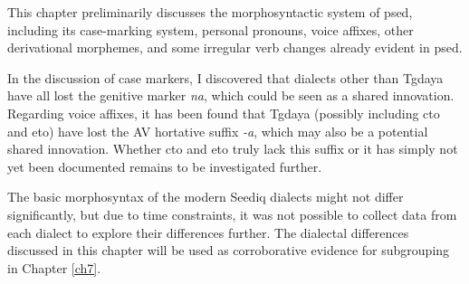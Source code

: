 
This chapter preliminarily discusses the morphosyntactic system of \acl{psed}, including its case-marking system, personal pronouns, voice affixes, other derivational morphemes, and some irregular verb changes already evident in \acl{psed}.

In the discussion of case markers, I discovered that dialects other than Tgdaya have all lost the genitive marker \textit{na}, which could be seen as a shared innovation. Regarding voice affixes, it has been found that Tgdaya (possibly including \acl{cto} and \acl{eto}) have lost the AV hortative suffix \textit{-a}, which may also be a potential shared innovation. Whether \acl{cto} and \acl{eto} truly lack this suffix or it has simply not yet been documented remains to be investigated further.

The basic morphosyntax of the modern Seediq dialects might not differ significantly, but due to time constraints, it was not possible to collect data from each dialect to explore their differences further. The dialectal differences discussed in this chapter will be used as corroborative evidence for subgrouping in Chapter \ref{ch7}.